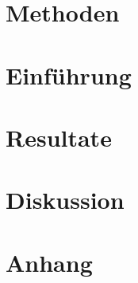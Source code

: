\documentclass[12pt, a4paper, twoside]{report}
\title{}
\author{}
\date{\today}
\begin{document}
 



 
\tableofcontents

\listoffigures

\listoftables



\printglossary[title=Glossar, toctitle=Glossar]
\chapter{Methoden}


\chapter{Einführung}


\chapter{Resultate}


\chapter{Diskussion}


\appendix
\chapter{Anhang}


\printbibliography
\end{document}
